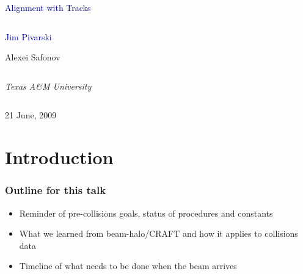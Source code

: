\documentclass[compress]{beamer}
\begin{document}
\begin{frame}
\vfill
\begin{center}
\textcolor{darkblue}{\Large Alignment with Tracks}

\vfill
\begin{columns}
\begin{center}
\large
\textcolor{darkblue}{Jim Pivarski}

\vspace{0.2 cm}
Alexei Safonov
\end{center}
\end{columns}

\begin{columns}
\begin{center}
\scriptsize
{\it Texas A\&M University}
\end{center}
\end{columns}

\vfill
21 June, 2009

\end{center}
\end{frame}


\small

\section*{Introduction}

\begin{frame}
\frametitle{Outline for this talk}
\begin{itemize}\setlength{\itemsep}{0.75 cm}
\item Reminder of pre-collisions goals, status of procedures and constants
\item What we learned from beam-halo/CRAFT and how it applies to collisions data
\item Timeline of what needs to be done when the beam arrives
\end{itemize}
\end{frame}
\end{document}
